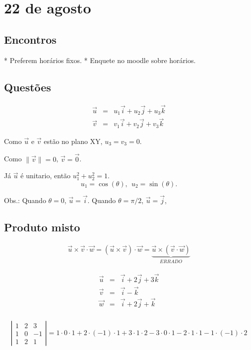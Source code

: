 \documentclass[a4paper,10pt]{book}
\title{}
\author{}
\begin{document}
\chapter{22 de agosto}

\section{Encontros}

* Preferem horários fixos. 
* Enquete no moodle sobre horários.

\section{Questões}
\begin{eqnarray*}
 \vec{u} &=& u_1\vec{i} + u_2\vec{j} + u_3\vec{k}\\
 \vec{v} &=& v_1\vec{i} + v_2\vec{j} + v_3\vec{k}
\end{eqnarray*}

Como $\vec{u}$ e $\vec{v}$ estão no plano XY, $u_3=v_3=0$. 

Como $\|\vec{v}\|=0$, $\vec{v}=\vec{0}$.

Já $\vec{u}$ é unitario, então $u_1^2+u_2^2=1$.
$$u_1=\cos(\theta),~~u_2=\sin(\theta).$$

Obs.: Quando $\theta=0$, $\vec{u}=\vec{i}$.
Quando $\theta=\pi/2$, $\vec{u}=\vec{j}$,

\section{Produto misto}
\begin{eqnarray*}
 \vec{u}\times  \vec{v} \cdot \vec{w}=(\vec{u}\times  \vec{v}) \cdot \vec{w}=\underbrace{\vec{u}\times(  \vec{v} \cdot \vec{w})}_{ERRADO}
\end{eqnarray*}


\begin{eqnarray*}
\vec{u}&=&\vec{i}+2\vec{j}+3\vec{k}\\
\vec{v}&=&\vec{i}       -\vec{k}\\
\vec{w}&=&\vec{i}+2\vec{j}+\vec{k}\\
\end{eqnarray*}

\begin{eqnarray*}
\left|\begin{array}{ccc}
1&2&3\\       
1&0&-1\\
1&2&1
      \end{array}
\right| = 1\cdot 0 \cdot 1 + 2\cdot(-1)\cdot1 + 3\cdot 1\cdot 2 - 3\cdot 0\cdot 1 - 2\cdot 1\cdot 1 - 1 \cdot (-1) \cdot 2
\end{eqnarray*}
\end{document}
